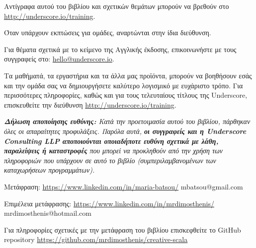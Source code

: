 \begin{center}

Αντίγραφα αυτού του βιβλίου και σχετικών θεμάτων μπορούν να βρεθούν στο \href{http://underscore.io/training}{http://underscore.io/training}.

Όταν υπάρχουν εκπτώσεις για ομάδες, αναρτώνται στην ίδια διεύθυνση.

Για θέματα σχετικά με το κείμενο της Αγγλικής έκδοσης, επικοινωνήστε με τους συγγραφείς στο: \href{mailto:hello@underscore.io}{hello@underscore.io}.

\vspace{3em}

Τα μαθήματά, τα εργαστήρια και τα άλλα μας προϊόντα, μπορούν να βοηθήσουν εσάς και την ομάδα σας να δημιουργήσετε καλύτερο λογισμικό με ευχάριστο τρόπο. Για περισσότερες πληροφορίες, καθώς και για τους τελευταίους τίτλους της Underscore, επισκευθείτε την διεύθυνση \href{http://underscore.io/training}{http://underscore.io/training}.

\vspace{3em}

\textit{\textbf{Δήλωση αποποίησης ευθύνης:} Κατά την προετοιμασία αυτού του βιβλίου, πάρθηκαν όλες οι απαραίτητες προφυλάξεις. Παρόλα αυτά, \textbf{οι συγγραφείς και η Underscore Consulting LLP αποποιούνται οποιαδήποτε ευθύνη σχετικά με λάθη, παραλείψεις ή καταστροφές} που μπορεί να προκληθούν από την χρήση των πληροφοριών που υπάρχουν σε αυτό το βιβλίο (συμπεριλαμβανομένων των καταχωρήσεων προγραμμάτων).}

\vspace{3em}

Μετάφραση: \href{Μαρία Μπάτσου}{https://www.linkedin.com/in/maria-batsou/} mbatsou@gmail.com

\vspace{3em}

Επιμέλεια μετάφρασης: \href{Δημοσθένης Μιχαηλίδης}{https://www.linkedin.com/in/mrdimosthenis/} mrdimosthenis@hotmail.com

\vspace{3em}

Για πληροφορίες σχετικές με την μετάφραση του βιβλίου επισκεφθείτε το GitHub repository \href{mrdimosthenis/creative-scala}{https://github.com/mrdimosthenis/creative-scala}

\end{center}
